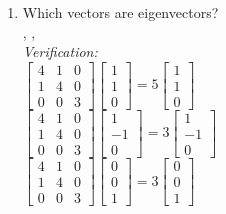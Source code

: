 \documentclass{article}
\begin{document}
\begin{enumerate}
\item Which vectors are eigenvectors? \\
, ,  \\
\textit{Verification:} \\
$\begin{bmatrix} 4 & 1 & 0 \\ 1 & 4 & 0 \\ 0 & 0 & 3 \end{bmatrix}\begin{bmatrix} 1 \\ 1 \\ 0 \end{bmatrix} = 5\begin{bmatrix} 1 \\ 1 \\ 0 \end{bmatrix}$ \\
$\begin{bmatrix} 4 & 1 & 0 \\ 1 & 4 & 0 \\ 0 & 0 & 3 \end{bmatrix}\begin{bmatrix} 1 \\ -1 \\ 0 \end{bmatrix} = 3\begin{bmatrix} 1 \\ -1 \\ 0 \end{bmatrix}$ \\
$\begin{bmatrix} 4 & 1 & 0 \\ 1 & 4 & 0 \\ 0 & 0 & 3 \end{bmatrix}\begin{bmatrix} 0 \\ 0 \\ 1 \end{bmatrix} = 3\begin{bmatrix} 0 \\ 0 \\ 1 \end{bmatrix}$
\end{enumerate}
\end{document}
